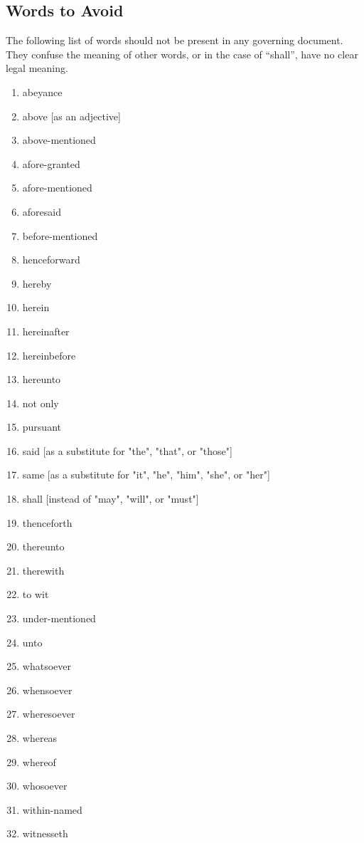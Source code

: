 \documentclass[12pt, letterpaper]{report}
\begin{document}
\begin{linenumbers}
	\chapter{Words to Avoid}
	The following list of words should not be present in any governing document. They confuse the meaning of other words, or in the case of ``shall'', have no clear legal meaning. 
	\begin{multicols}{2}
			\begin{enumerate}\renewcommand{\labelenumi}{\bfseries\arabic{enumi})}
			\item 		abeyance
			\item 		above [as an adjective]
			\item 		above-mentioned
			\item 		afore-granted
			\item 		afore-mentioned
			\item 		aforesaid
			\item 		before-mentioned
			\item 		henceforward
			\item 		hereby
			\item 		herein
			\item 		hereinafter
			\item 		hereinbefore
			\item 		hereunto
			\item       not only
			\item 		pursuant
			\item 		said [as a substitute for "the", "that", or "those"]
			\item 		same [as a substitute for "it", "he", "him", "she", or "her"]
			\item 		shall [instead of "may", "will", or "must"]
			\item 		thenceforth
			\item 		thereunto
			\item 		therewith
			\item 		to wit
			\item 		under-mentioned 
			\item 		unto
			\item 		whatsoever
			\item whensoever
			\item 		wheresoever
			\item 		whereas
			\item 	whereof
			\item 		whosoever
			\item within-named
			\item witnesseth
		\end{enumerate}
		

\end{multicols}
\end{linenumbers}
\end{document}
